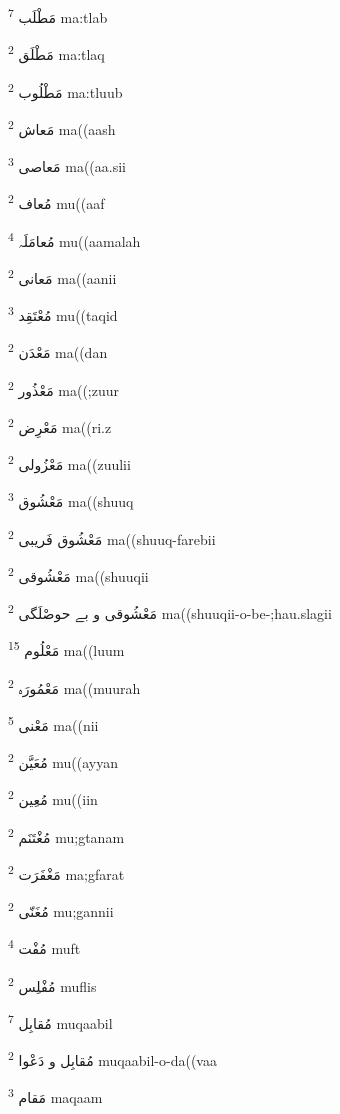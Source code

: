 \documentclass[12pt]{article}
\begin{document}
\begin{RTL}
\begin{multicols}{5}
{\ur مَطْلَب}   \textsuperscript{7} ma:tlab

{\ur مَطْلَق}   \textsuperscript{2} ma:tlaq

{\ur مَطْلُوب}   \textsuperscript{2} ma:tluub

{\ur مَعاش}   \textsuperscript{2} ma((aash

{\ur مَعاصی}   \textsuperscript{3} ma((aa.sii

{\ur مُعاف}   \textsuperscript{2} mu((aaf

{\ur مُعامَلَہ}   \textsuperscript{4} mu((aamalah

{\ur مَعانی}   \textsuperscript{2} ma((aanii

{\ur مُعْتَقِد}   \textsuperscript{3} mu((taqid

{\ur مَعْدَن}   \textsuperscript{2} ma((dan

{\ur مَعْذُور}   \textsuperscript{2} ma((;zuur

{\ur مَعْرِض}   \textsuperscript{2} ma((ri.z

{\ur مَعْزُولی}   \textsuperscript{2} ma((zuulii

{\ur مَعْشُوق}   \textsuperscript{3} ma((shuuq

{\ur مَعْشُوق فَریبی}   \textsuperscript{2} ma((shuuq-farebii

{\ur مَعْشُوقی}   \textsuperscript{2} ma((shuuqii

{\ur مَعْشُوقی و بے حوصْلَگی}   \textsuperscript{2} ma((shuuqii-o-be-;hau.slagii

{\ur مَعْلُوم}   \textsuperscript{15} ma((luum

{\ur مَعْمُورَہ}   \textsuperscript{2} ma((muurah

{\ur مَعْنی}   \textsuperscript{5} ma((nii

{\ur مُعَیَّن}   \textsuperscript{2} mu((ayyan

{\ur مُعِین}   \textsuperscript{2} mu((iin

{\ur مُغْتَنَم}   \textsuperscript{2} mu;gtanam

{\ur مَغْفَرَت}   \textsuperscript{2} ma;gfarat

{\ur مُغَنّی}   \textsuperscript{2} mu;gannii

{\ur مُفْت}   \textsuperscript{4} muft

{\ur مُفْلِس}   \textsuperscript{2} muflis

{\ur مُقابِل}   \textsuperscript{7} muqaabil

{\ur مُقابِل و دَعْوا}   \textsuperscript{2} muqaabil-o-da((vaa

{\ur مَقام}   \textsuperscript{3} maqaam


\end{multicols}
\end{RTL}
\end{document}
